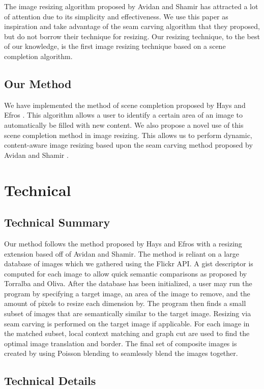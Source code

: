\documentclass[11pt]{amsart}
\begin{document}
The image resizing algorithm proposed by Avidan and Shamir has attracted a lot of attention due
to its simplicity and effectiveness. We use this paper as inspiration and take advantage of the seam carving algorithm that they proposed, but do not borrow their technique for resizing. Our resizing technique, to the best of our knowledge, is the first image resizing technique based on a scene
completion algorithm.

\subsection{Our Method}

We have implemented the method of scene completion proposed by Hays and Efros \cite{Hays:2007}. This algorithm allows a user to identify a certain area of an image to automatically be filled with new content. We also propose a novel use of this scene completion method in image resizing. This allows us to perform dynamic, content-aware image resizing based upon the seam carving method proposed by Avidan and Shamir \cite{Avidan:2007}.

\section{Technical}

\subsection{Technical Summary}
Our method follows the method proposed by Hays and Efros\cite{Hays:2007} with a resizing extension based off of Avidan and Shamir. \cite{Avidan:2007} The method is reliant on a large database of images which we gathered using the Flickr API. A gist descriptor is computed for each image to allow quick semantic comparisons as proposed by Torralba and Oliva. \cite{Torralba:2006} After the database has been initialized, a user may run the program by specifying a target image, an area of the image to remove, and the amount of pixels to resize each dimension by. The program then finds a small subset of images that are semantically similar to the target image. Resizing via seam carving is performed on the target image if applicable. For each image in the matched subset, local context matching and graph cut are used to find the optimal image translation and border. The final set of composite images is created by using Poisson blending to seamlessly blend the images together.

\subsection{Technical Details}
\end{document}
